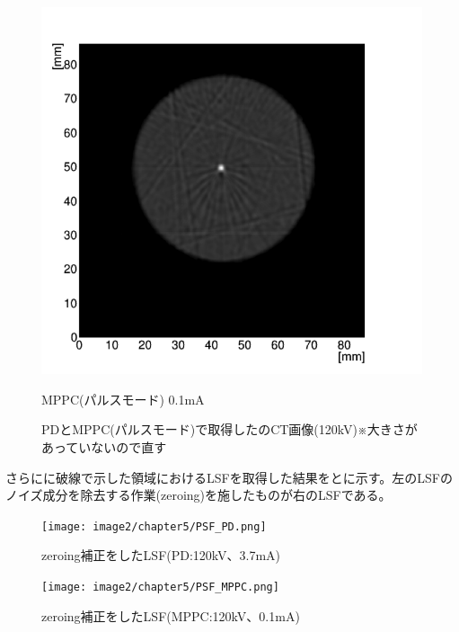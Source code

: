 \begin{figure}[H]
\begin{minipage}{0.5\hsize}
\begin{center}
 \includegraphics[bb=0.000000 0.000000 346.531353 333.572425,width=1\hsize]{image2/chapter5/CT_MTF_MPPCpulse.png} 
  \end{center}
  \vspace{-1cm}
  \caption*{MPPC(パルスモード) 0.1mA}
 \end{minipage}
 \begin{center}
  \caption{PDとMPPC(パルスモード)で取得したのCT画像(120kV)※大きさがあっていないので直す}
  \label{fig:CT_MTF}
  \end{center}
\end{figure}

さらにに破線で示した領域におけるLSFを取得した結果をとに示す。左のLSFのノイズ成分を除去する作業(zeroing)を施したものが右のLSFである。


\begin{figure}[H]
 \begin{center}
 \texttt{[image: image2/chapter5/PSF\_PD.png]} 
 \end{center}
 \caption{zeroing補正をしたLSF(PD:120kV、3.7mA)}
 \label{fig:PSF_PD}
\end{figure}


\begin{figure}[H]
 \begin{center}
 \texttt{[image: image2/chapter5/PSF\_MPPC.png]} 
 \end{center}
 \caption{zeroing補正をしたLSF(MPPC:120kV、0.1mA)}
 \label{fig:PSF_MPPC}
\end{figure}

